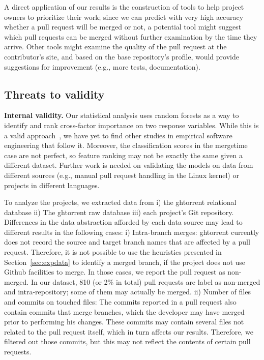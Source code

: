 \documentclass{acm_proc_article-sp}
\begin{document}

A direct application of our results is the construction of tools to help project owners to prioritize their work; since we can predict
with very high accuracy whether a pull request will be merged or not, a
potential tool might suggest which pull requests can be merged without further
examination by the time they arrive. Other tools might examine the quality of
the pull request at the contributor's site, and based on the base repository's
profile, would provide suggestions for improvement (e.g., more tests,
documentation). 

\subsection{Threats to validity}

\textbf{Internal validity.} Our statistical analysis uses random forests as a way
to identify and rank cross-factor importance on two response variables. While
this is a valid approach~\cite{Genue10}, we have yet to find other studies in
empirical software engineering that follow it. Moreover, the classification
scores in the \textsf{mergetime} case are not perfect, so feature ranking may
not be exactly the same given a different dataset. Further work is needed on
validating the models on data from different sources (e.g., manual pull
request handling in the Linux kernel) or projects in different languages. 

To analyze the projects, we extracted data from i) the {\sc ght}orrent relational
database ii) The {\sc ght}orrent raw database iii) each project's Git repository.
Differences in the data abstraction afforded by each data source may
lead to different results in the following cases: 
i) Intra-branch merges: {\sc ght}orrent currently does not record the source
    and target branch names that are affected by a pull request. Therefore, it
    is not possible to use the heuristics presented in
    Section~\ref{sec:expdata} to identify a merged branch, if the project
    does not use Github facilities to merge. In those cases, we
    report the pull request as non-merged. In our dataset, 810 (or 2\% in total)
    pull requests are label as non-merged and intra-repository; some of them may
    actually be merged.
ii) Number of files and commits on touched files: The commits reported
    in a pull request also contain commits that merge branches, which the
    developer may have merged prior to performing his changes. These commits
    may contain several files not related to the pull request itself, which
    in turn affects our results. Therefore, we  
    filtered out those commits, but this may not reflect the contents of 
    certain pull requests.
\end{document}
